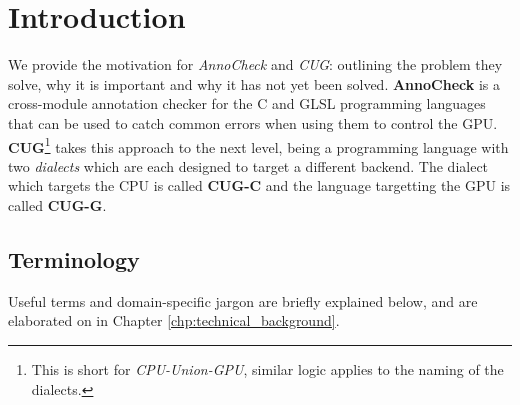 \documentclass[a4paper,12pt,twoside,openright]{report}
\begin{document}
\pagestyle{empty}
\singlespacing

\onehalfspacing

\singlespacing

\singlespacing


\setcounter{page}{0}
\pagestyle{plain}
\tableofcontents

\onehalfspacing


\chapter{Introduction}
\setcounter{page}{1}

\label{sec:TODO}

We provide the motivation for \textit{AnnoCheck} and \textit{CUG}: outlining
the problem they solve, why it is important and why it has not yet been solved.
\textbf{AnnoCheck} is a cross-module annotation checker for the C and GLSL
programming languages that can be used to catch common errors when using them
to control the GPU. \textbf{CUG}\footnote{This is short for
\textit{CPU-Union-GPU}, similar logic applies to the naming of the dialects.}
takes this approach to the next level, being a programming language with two
\textit{dialects} which are each designed to target a different backend. The
dialect which targets the CPU is called \textbf{CUG-C} and the language
targetting the GPU is called \textbf{CUG-G}.

\section{Terminology}


Useful terms and domain-specific jargon are briefly explained below, and are
elaborated on in Chapter \ref{chp:technical_background}.
\end{document}
